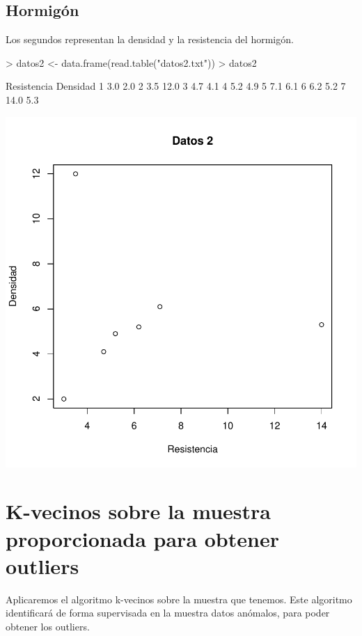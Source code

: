 \documentclass [a4paper] {article}
\begin{document}
\subsection{Hormigón}
Los segundos representan la densidad y la resistencia del hormigón.
\begin{Schunk}
\begin{Sinput}
> datos2 <- data.frame(read.table("datos2.txt"))
> datos2
\end{Sinput}
\begin{Soutput}
  Resistencia Densidad
1         3.0      2.0
2         3.5     12.0
3         4.7      4.1
4         5.2      4.9
5         7.1      6.1
6         6.2      5.2
7        14.0      5.3
\end{Soutput}
\end{Schunk}
\begin{center}
\includegraphics{entrega-plot_datos2}
\end{center}

\newpage
\section{K-vecinos sobre la muestra proporcionada para obtener outliers}
Aplicaremos el algoritmo k-vecinos sobre la muestra que tenemos.
Este algoritmo identificará de forma supervisada en la muestra datos anómalos, para poder obtener los outliers.
\end{document}
